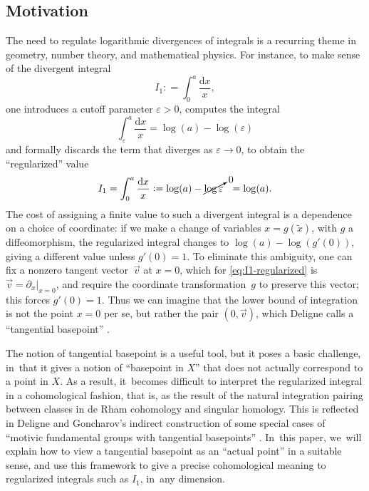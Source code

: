 \documentclass[JEP,XML,SOM,Unicode,NoFloatCountersInSection,published]{cedram}
\theoremstyle{definition}
\theoremstyle{remark}
\newcommand{\defas}{\mathrel{\mathop:}=}
\let\epsilon\varepsilon
\newcommand{\dd}{\mathrm{d}}
\newcommand{\dlog}[1]{\frac{\dd#1}{#1}}
\begin{document}
\subsection{Motivation}\label{sec:motivation}
The need to regulate logarithmic divergences of integrals is a recurring theme in geometry, number theory, and mathematical physics. For instance, to make sense of the divergent integral
\[
I_1 \defas
\int_0^a \dlog{x},
\]
one introduces a cutoff parameter $\epsilon > 0$, computes the integral
\[
\int_{\epsilon}^a \dlog{x} = \log(a) -\log(\epsilon)
\]
and formally discards the term that diverges as $\epsilon \to 0$, to obtain the ``regularized'' value
\begin{align}
I_1 = \int_0^a \dlog{x} \defas \log(a) - \cancelto{0}{\log\epsilon} \ \ = \log(a). \label{eq:I1-regularized}
\end{align}
The cost of assigning a finite value to such a divergent integral is a dependence on a choice of coordinate: if we make a change of variables $x = g(\tilde x)$, with $g$ a diffeomorphism, the regularized integral changes to $\log(a) - \log(g'(0))$, giving a different value unless $g'(0)=1$. To eliminate this ambiguity, one can fix a nonzero tangent vector~$\vec{v}$ at $x=0$, which for \eqref{eq:I1-regularized} is $\vec{v}=\partial_x|_{x=0}$, and require the coordinate transformation~$g$ to preserve this vector; this forces $g'(0)=1$. Thus we can imagine that the lower bound of integration is not the point $x=0$ per se, but rather the pair $(0,\vec{v})$, which Deligne calls a ``tangential basepoint'' \cite{Deligne1989}.

The notion of tangential basepoint is a useful tool, but it poses a basic challenge, in~that it gives a notion of ``basepoint in $X$'' that does not actually correspond to a point in $X$. As a result, it~becomes difficult to interpret the regularized integral in a cohomological fashion, that is, as the result of the natural integration pairing between classes in de Rham cohomology and singular homology. This is reflected \eg in Deligne and Goncharov's indirect construction of some special cases of ``motivic fundamental groups with tangential basepoints'' \cite{DeligneGoncharov}. In~this paper, we~will explain how to view a tangential basepoint as an ``actual point'' in a suitable sense, and use this framework to give a precise cohomological meaning to regularized integrals such as $I_1$, in~any dimension.
\end{document}
